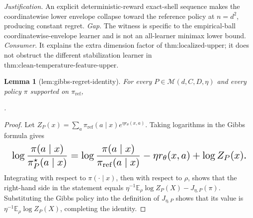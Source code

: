 \documentclass{article}
\newtheorem{lemma}{Lemma}
\begin{document}
\par\smallskip\noindent \textit{Justification.} An explicit deterministic-reward exact-shell sequence makes the coordinatewise lower envelope collapse toward the reference policy at \(n=d^2\), producing constant regret. \textit{Gap.} The witness is specific to the empirical-ball coordinatewise-envelope learner and is not an all-learner minimax lower bound. \textit{Consumer.} It explains the extra dimension factor of \(\text{thm:localized-upper}\); it does not obstruct the different stabilization learner in \(\text{thm:clean-temperature-feature-upper}\).

\begin{lemma}[lem:gibbs-regret-identity]\label{lem:gibbs-regret-identity}
For every \(P\in\mathcal M(d,C,D,\eta)\) and every policy \(\pi\) supported on \(\pi_{\mathrm{ref}}\), \par\noindent {}\par\noindent.
\end{lemma}
\begin{proof}
Let \(Z_P(x)=\sum_a\pi_{\mathrm{ref}}(a\mid x)e^{\eta r_\theta(x,a)}\). Taking logarithms in the Gibbs formula gives
\[
\makebox[\linewidth][c]{\resizebox{0.98\linewidth}{!}{\(\displaystyle \log\frac{\pi(a\mid x)}{\pi_P^\star(a\mid x)}
=\log\frac{\pi(a\mid x)}{\pi_{\mathrm{ref}}(a\mid x)}-\eta r_\theta(x,a)+\log Z_P(x).\)}}
\]
Integrating with respect to \(\pi(\cdot\mid x)\), then with respect to \(\rho\), shows that the right-hand side in the statement equals \(\eta^{-1}\mathbb E_\rho\log Z_P(X)-J_{\eta,P}(\pi)\). Substituting the Gibbs policy into the definition of \(J_{\eta,P}\) shows that its value is \(\eta^{-1}\mathbb E_\rho\log Z_P(X)\), completing the identity.
\end{proof}
\end{document}
